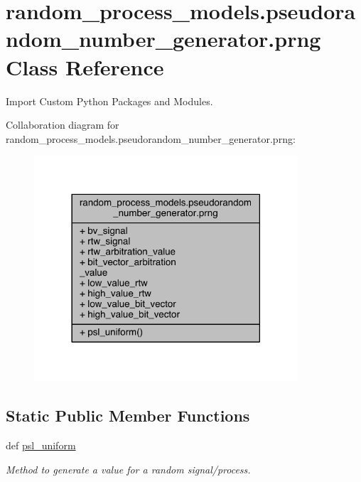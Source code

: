 \hypertarget{classrandom__process__models_1_1pseudorandom__number__generator_1_1prng}{}\section{random\+\_\+process\+\_\+models.\+pseudorandom\+\_\+number\+\_\+generator.\+prng Class Reference}
\label{classrandom__process__models_1_1pseudorandom__number__generator_1_1prng}


Import Custom Python Packages and Modules.  




Collaboration diagram for random\+\_\+process\+\_\+models.\+pseudorandom\+\_\+number\+\_\+generator.\+prng\+:
\nopagebreak
\begin{figure}[H]
\begin{center}
\leavevmode
\includegraphics[width=278pt]{d0/d0d/classrandom__process__models_1_1pseudorandom__number__generator_1_1prng__coll__graph}
\end{center}
\end{figure}
\subsection*{Static Public Member Functions}
\begin{DoxyCompactItemize}
\item 
def \hyperlink{classrandom__process__models_1_1pseudorandom__number__generator_1_1prng_a1dcc8cc1bddef1852a007afc2f115f5e}{psl\+\_\+uniform}
\begin{DoxyCompactList}\small\item\em Method to generate a value for a random signal/process. \end{DoxyCompactList}\end{DoxyCompactItemize}
